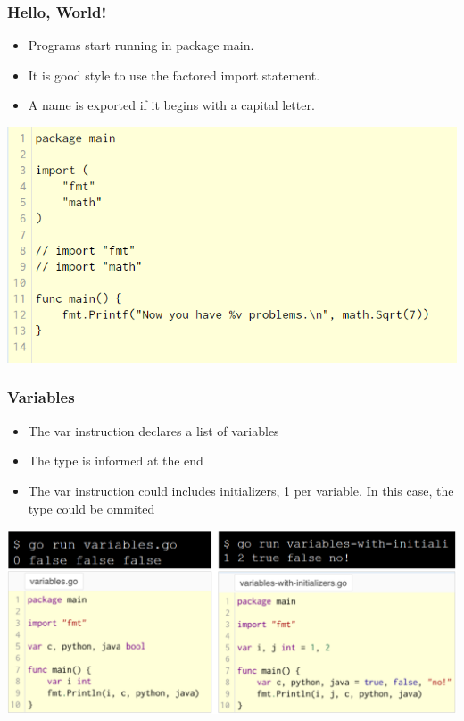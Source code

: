 \documentclass[14pt]{beamer}
\begin{document}
{
\begin{frame}
    \frametitle{Hello, World!}
    \begin{itemize}
\item Programs start running in package main.
\item It is good style to use the factored import statement.
\item A name is exported if it begins with a capital letter.
    \end{itemize}
    \begin{center}
    \includegraphics[width=0.7\linewidth]{img/introtogo.PNG}
    \end{center}
\end{frame}
}

{
\begin{frame}
    \frametitle{Variables}
    \begin{itemize}
\item The var instruction declares a list of variables
\item The type is informed at the end
\item The var instruction could includes initializers, 1 per variable. In this case, the type could be ommited
    \end{itemize}
    \begin{center}
    \includegraphics[width=\linewidth]{img/variables.PNG}
    \end{center}
\end{frame}
}
\end{document}
